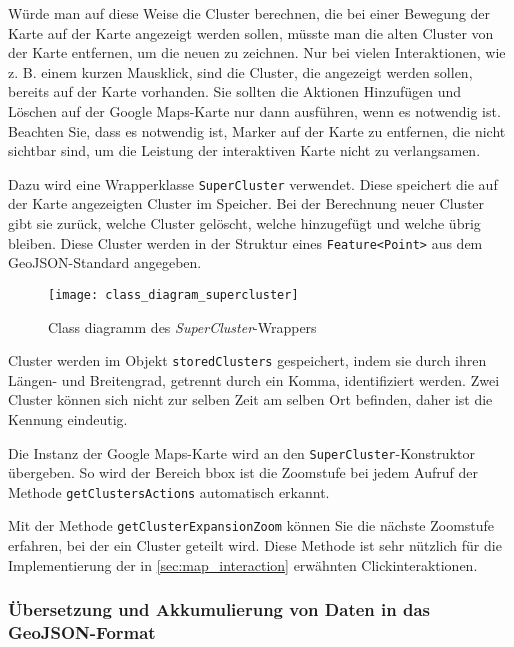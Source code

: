 Würde man auf diese Weise die Cluster berechnen, die bei einer Bewegung der Karte auf der Karte angezeigt werden sollen, müsste man die alten Cluster von der Karte entfernen, um die neuen zu zeichnen.
Nur bei vielen Interaktionen, wie z. B. einem kurzen Mausklick, sind die Cluster, die angezeigt werden sollen, bereits auf der Karte vorhanden.
Sie sollten die Aktionen Hinzufügen und Löschen auf der Google Maps-Karte nur dann ausführen, wenn es notwendig ist.
Beachten Sie, dass es notwendig ist, Marker auf der Karte zu entfernen, die nicht sichtbar sind, um die Leistung der interaktiven Karte nicht zu verlangsamen.

Dazu wird eine Wrapperklasse \lstinline{SuperCluster} verwendet.
Diese speichert die auf der Karte angezeigten Cluster im Speicher.
Bei der Berechnung neuer Cluster gibt sie zurück, welche Cluster gelöscht, welche hinzugefügt und welche übrig bleiben.
Diese Cluster werden in der Struktur eines \lstinline{Feature<Point>} aus dem GeoJSON-Standard\cite{rfc7946} angegeben.

\begin{figure}[H]
  \centering
  \texttt{[image: class\_diagram\_supercluster]}
  \caption{Class diagramm des \textit{SuperCluster}-Wrappers}
  \label{fig:class_diagram_supercluster}
\end{figure}

Cluster werden im Objekt \lstinline{storedClusters} gespeichert, indem sie durch ihren Längen- und Breitengrad, getrennt durch ein Komma, identifiziert werden.
Zwei Cluster können sich nicht zur selben Zeit am selben Ort befinden, daher ist die Kennung eindeutig.

Die Instanz der Google Maps-Karte wird an den \lstinline{SuperCluster}-Konstruktor übergeben.
So wird der Bereich bbox ist die Zoomstufe bei jedem Aufruf der Methode \lstinline{getClustersActions} automatisch erkannt.

Mit der Methode \lstinline{getClusterExpansionZoom} können Sie die nächste Zoomstufe erfahren, bei der ein Cluster geteilt wird.
Diese Methode ist sehr nützlich für die Implementierung der in \ref{sec:map_interaction} erwähnten Clickinteraktionen.

\subsubsection{Übersetzung und Akkumulierung von Daten in das GeoJSON-Format}

